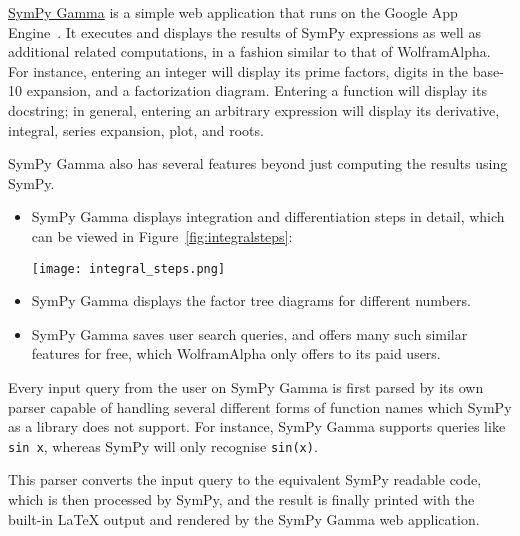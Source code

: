 \href{http://sympygamma.com}{SymPy Gamma} is a simple web application that
runs on the Google App Engine~\cite{ciurana2009google}. It executes and
displays the results of SymPy expressions as well as additional related
computations, in a fashion similar to that of Wolfram\textbar{}Alpha. For
instance, entering an integer will display its prime factors, digits in the
base-10 expansion, and a factorization diagram. Entering a function will
display its docstring; in general, entering an arbitrary expression will
display its derivative, integral, series expansion, plot, and roots.

SymPy Gamma also has several features beyond just computing the
results using SymPy.

\begin{itemize}
\item
  SymPy Gamma displays integration and differentiation steps in detail, which
  can be viewed in Figure~\ref{fig:integralsteps}:\par
  {
    \centering
    \texttt{[image: integral\_steps.png]}
    \label{fig:integralsteps}
    \par
  }
\item
  SymPy Gamma displays the factor tree diagrams for different numbers.
\item
  SymPy Gamma saves user search queries, and offers many such similar features
  for free, which Wolfram\textbar{}Alpha only offers to its paid users.
\end{itemize}
Every input query from the user on SymPy Gamma is first parsed by its
own parser capable of handling several different forms of function names
which SymPy as a library does not support. For instance, SymPy Gamma
supports queries like \texttt{sin\ x}, whereas SymPy will only recognise
\verb|sin(x)|.

This parser converts the input query to the equivalent SymPy readable code,
which is then processed by SymPy, and the result is finally printed
with the built-in \LaTeX{} output and rendered by the SymPy Gamma web application.
